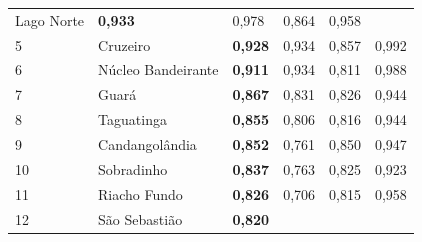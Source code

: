 \begin{table}[]
\begin{tabular}{llllll}
        {\color[HTML]{0B0080} Lago Norte} &
        {\color[HTML]{202122} \textbf{0,933}} &
        {\color[HTML]{202122} 0,978} &
        {\color[HTML]{202122} 0,864} &
        {\color[HTML]{202122} 0,958} \\
        \rowcolor[HTML]{F8F9FA}
        {\color[HTML]{202122} 5} &
        {\color[HTML]{0B0080} Cruzeiro} &
        {\color[HTML]{202122} \textbf{0,928}} &
        {\color[HTML]{202122} 0,934} &
        {\color[HTML]{202122} 0,857} &
        {\color[HTML]{202122} 0,992} \\
        \rowcolor[HTML]{F8F9FA}
        {\color[HTML]{202122} 6} &
        {\color[HTML]{0B0080} Núcleo Bandeirante} &
        {\color[HTML]{202122} \textbf{0,911}} &
        {\color[HTML]{202122} 0,934} &
        {\color[HTML]{202122} 0,811} &
        {\color[HTML]{202122} 0,988} \\
        \rowcolor[HTML]{F8F9FA}
        {\color[HTML]{202122} 7} &
        {\color[HTML]{0B0080} Guará} &
        {\color[HTML]{202122} \textbf{0,867}} &
        {\color[HTML]{202122} 0,831} &
        {\color[HTML]{202122} 0,826} &
        {\color[HTML]{202122} 0,944} \\
        \rowcolor[HTML]{F8F9FA}
        {\color[HTML]{202122} 8} &
        {\color[HTML]{0B0080} Taguatinga} &
        {\color[HTML]{202122} \textbf{0,855}} &
        {\color[HTML]{202122} 0,806} &
        {\color[HTML]{202122} 0,816} &
        {\color[HTML]{202122} 0,944} \\
        \rowcolor[HTML]{F8F9FA}
        {\color[HTML]{202122} 9} &
        {\color[HTML]{0B0080} Candangolândia} &
        {\color[HTML]{202122} \textbf{0,852}} &
        {\color[HTML]{202122} 0,761} &
        {\color[HTML]{202122} 0,850} &
        {\color[HTML]{202122} 0,947} \\
        \rowcolor[HTML]{F8F9FA}
        {\color[HTML]{202122} 10} &
        {\color[HTML]{0B0080} Sobradinho} &
        {\color[HTML]{202122} \textbf{0,837}} &
        {\color[HTML]{202122} 0,763} &
        {\color[HTML]{202122} 0,825} &
        {\color[HTML]{202122} 0,923} \\
        \rowcolor[HTML]{F8F9FA}
        {\color[HTML]{202122} 11} &
        {\color[HTML]{0B0080} Riacho Fundo} &
        {\color[HTML]{202122} \textbf{0,826}} &
        {\color[HTML]{202122} 0,706} &
        {\color[HTML]{202122} 0,815} &
        {\color[HTML]{202122} 0,958} \\
        \rowcolor[HTML]{F8F9FA}
        {\color[HTML]{202122} 12} &
        {\color[HTML]{0B0080} São Sebastião} &
        {\color[HTML]{202122} \textbf{0,820}} &

\end{tabular}
\end{table}
